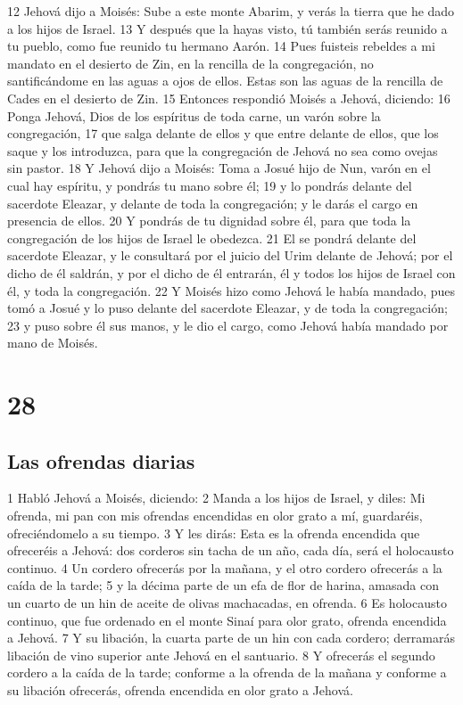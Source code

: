 12 Jehová dijo a Moisés: Sube a este monte Abarim, y verás la tierra que he dado a los hijos de Israel.
13 Y después que la hayas visto, tú también serás reunido a tu pueblo, como fue reunido tu hermano Aarón.
14 Pues fuisteis rebeldes a mi mandato en el desierto de Zin, en la rencilla de la congregación, no santificándome en las aguas a ojos de ellos. Estas son las aguas de la rencilla de Cades en el desierto de Zin.
15 Entonces respondió Moisés a Jehová, diciendo:
16 Ponga Jehová, Dios de los espíritus de toda carne, un varón sobre la congregación,
17 que salga delante de ellos y que entre delante de ellos, que los saque y los introduzca, para que la congregación de Jehová no sea como ovejas sin pastor.
18 Y Jehová dijo a Moisés: Toma a Josué hijo de Nun, varón en el cual hay espíritu, y pondrás tu mano sobre él;
19 y lo pondrás delante del sacerdote Eleazar, y delante de toda la congregación; y le darás el cargo en presencia de ellos.
20 Y pondrás de tu dignidad sobre él, para que toda la congregación de los hijos de Israel le obedezca.
21 El se pondrá delante del sacerdote Eleazar, y le consultará por el juicio del Urim  delante de Jehová; por el dicho de él saldrán, y por el dicho de él entrarán, él y todos los hijos de Israel con él, y toda la congregación.
22 Y Moisés hizo como Jehová le había mandado, pues tomó a Josué y lo puso delante del sacerdote Eleazar, y de toda la congregación;
23 y puso sobre él sus manos, y le dio el cargo, como Jehová había mandado por mano de Moisés.

\chapter{28}

\section*{Las ofrendas diarias}

1 Habló Jehová a Moisés, diciendo: 
2 Manda a los hijos de Israel, y diles: Mi ofrenda, mi pan con mis ofrendas encendidas en olor grato a mí, guardaréis, ofreciéndomelo a su tiempo.
3 Y les dirás: Esta es la ofrenda encendida que ofreceréis a Jehová: dos corderos sin tacha de un año, cada día, será el holocausto continuo.
4 Un cordero ofrecerás por la mañana, y el otro cordero ofrecerás a la caída de la tarde;
5 y la décima parte de un efa   de flor de harina, amasada con un cuarto de un hin de aceite de olivas machacadas, en ofrenda.
6 Es holocausto continuo, que fue ordenado en el monte Sinaí para olor grato, ofrenda encendida a Jehová.
7 Y su libación, la cuarta parte de un hin   con cada cordero; derramarás libación de vino superior ante Jehová en el santuario.
8 Y ofrecerás el segundo cordero a la caída de la tarde; conforme a la ofrenda de la mañana y conforme a su libación ofrecerás, ofrenda encendida en olor grato a Jehová.


